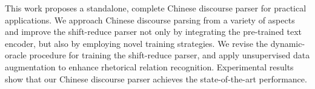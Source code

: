 This work proposes a standalone, complete Chinese discourse parser for practical applications. We approach Chinese discourse parsing from a variety of aspects and improve the shift-reduce parser not only by integrating the pre-trained text encoder, but also by employing novel training strategies. We revise the dynamic-oracle procedure for training the shift-reduce parser, and apply unsupervised data augmentation to enhance rhetorical relation recognition. Experimental results show that our Chinese discourse parser achieves the state-of-the-art performance.
